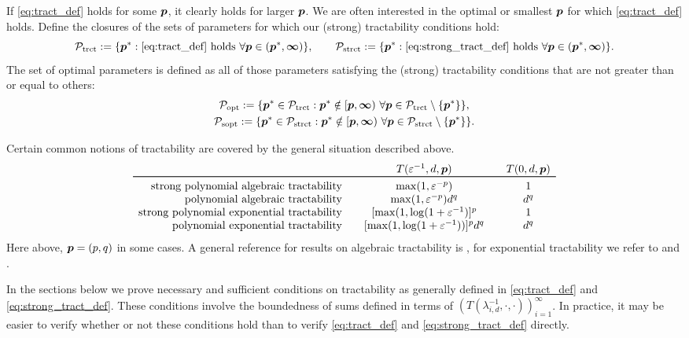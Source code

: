 \documentclass[11pt,a4paper]{article}
\newcommand{\peter}[1]{\begingroup\color{purple}#1\endgroup}
\begin{document}
If \eqref{eq:tract_def} holds for some $\boldsymbol{p}$, it clearly holds for larger $\boldsymbol{p}$.  We are often interested in the optimal or smallest $\boldsymbol{p}$ for which \eqref{eq:tract_def} holds.  Define the closures of the sets of parameters for which our (strong) tractability conditions hold:
\begin{equation*}
	\mathcal{P}_{\textup{trct}} : = \{\boldsymbol{p}^* : \eqref{eq:tract_def} \text{ holds }\forall \boldsymbol{p} \in (\boldsymbol{p}^*,\boldsymbol{\infty})\}, \qquad
	\mathcal{P}_{\textup{strct}} : = \{\boldsymbol{p}^* : \eqref{eq:strong_tract_def} \text{ holds }\forall \boldsymbol{p} \in (\boldsymbol{p}^*,\boldsymbol{\infty})\}.
\end{equation*}
The  set of optimal parameters is defined as all of those parameters satisfying the (strong) tractability conditions that are not greater than or equal to others:
\begin{gather}
	\label{eq:Poptdef}
	\mathcal{P}_{\textup{opt}} : = \{\boldsymbol{p}^* \in \mathcal{P}_{\textup{trct}} :  \boldsymbol{p}^* \notin [\boldsymbol{p},\boldsymbol{\infty}) \ \forall \boldsymbol{p} \in  \mathcal{P}_{\textup{trct}} \setminus \{\boldsymbol{p}^*\} \}, \\
	\label{eq:Psoptdef}
	\mathcal{P}_{\textup{sopt}} : = \{\boldsymbol{p}^* \in \mathcal{P}_{\textup{strct}} :  \boldsymbol{p}^* \notin [\boldsymbol{p},\boldsymbol{\infty}) \ \forall \boldsymbol{p} \in  \mathcal{P}_{\textup{strct}} \setminus \{\boldsymbol{p}^*\} \}.
\end{gather}

Certain common notions of tractability are covered by the general situation described above.
\begin{equation*}
	\begin{array}{r@{\qquad}c@{\qquad}cc}
		& T(\varepsilon^{-1},d,\vp)
		& T(0,d,\vp)\\
		\toprule
		\text{strong polynomial algebraic  tractability} & \max(1,\varepsilon^{-p}) & 1\\
		\text{polynomial algebraic tractability} & \max(1,\varepsilon^{-p})d^{q} & d^{q}\\
		\text{strong polynomial exponential tractability} &  [\max(1,\log(1 + \varepsilon^{-1})]^p & 1\\
		\text{polynomial exponential tractability} &
		[\max(1,\log(1 + \varepsilon^{-1}))]^p  d^{q} & d^{q}
	\end{array}
\end{equation*}
Here above, $\boldsymbol{p} = (p,q)$ in some cases. \peter{A general reference 
for results on algebraic tractability is \cite{NW08}, for exponential tractability we refer to \cite{HKW19} and \cite{KW19}.}


In the sections below we prove necessary and sufficient conditions on tractability as generally defined in \eqref{eq:tract_def} and \eqref{eq:strong_tract_def}.  These conditions involve the boundedness of sums defined in terms of \peter{$(T(\lambda_{i,d}^{-1},\cdot, \cdot))_{i=1}^\infty$}.  In practice, it may be easier to verify whether or not these conditions hold than to verify \peter{\eqref{eq:tract_def} and \eqref{eq:strong_tract_def}} directly.
\end{document}
